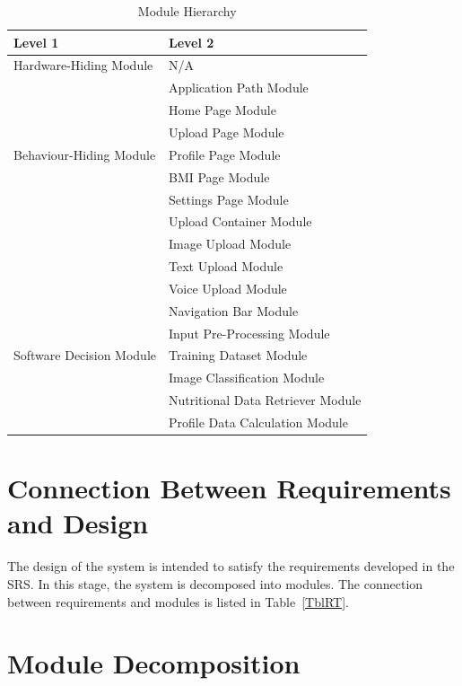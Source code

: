 \documentclass[12pt, titlepage]{article}
\begin{document}
\begin{table}[H]
\centering
\begin{tabular}{p{} p{}}
\toprule
\textbf{Level 1} & \textbf{Level 2}\\
\midrule

{Hardware-Hiding Module} & N/A \\
\midrule

\multirow{7}{0.3\textwidth}{Behaviour-Hiding Module}
& Application Path Module\\
& Home Page Module\\
& Upload Page Module\\
& Profile Page Module\\
& BMI Page Module\\
& Settings Page Module\\
& Upload Container Module \\
& Image Upload Module\\
& Text Upload Module \\
& Voice Upload Module \\
& Navigation Bar Module\\ 
\midrule

\multirow{3}{0.3\textwidth}{Software Decision Module} & Input Pre-Processing Module\\
& Training Dataset Module\\
& Image Classification Module\\
& Nutritional Data Retriever Module\\
& Profile Data Calculation Module\\
\bottomrule

\end{tabular}
\caption{Module Hierarchy}
\label{TblMH}
\end{table}

\section{Connection Between Requirements and Design} \label{SecConnection}

The design of the system is intended to satisfy the requirements developed in
the SRS. In this stage, the system is decomposed into modules. The connection
between requirements and modules is listed in Table~\ref{TblRT}.

\section{Module Decomposition} \label{SecMD}
\end{document}
